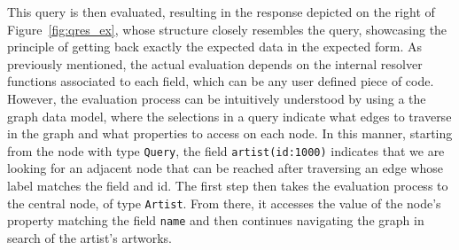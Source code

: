 This query is then evaluated, resulting in the response
depicted on the right of Figure~\ref{fig:qres_ex}, whose structure closely
resembles the query, showcasing the \gql principle of getting back exactly the expected data 
in the expected form. As previously mentioned, the actual evaluation depends on the
internal resolver functions associated to each field, which can be any user defined piece of code.
However, the evaluation process can be intuitively understood by using a the graph data model, where
the selections in a query indicate what edges to traverse in the graph and 
what properties to access on each node. In this manner, starting from the
node with type \texttt{Query}, the field \texttt{artist(id:1000)} indicates that 
we are looking for an adjacent node that can be reached after traversing an edge whose label matches the
field and id. The first step then takes the evaluation process to the central
node, of type \texttt{Artist}.  From there, it accesses the value
of the node's property matching the field \texttt{name} and then
continues navigating the graph in search of the artist's artworks.

